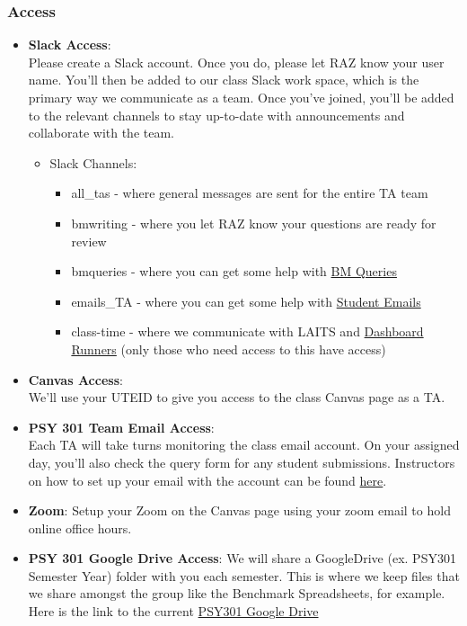 \documentclass[
]{article}
\providecommand{\tightlist}{%
  \setlength{\itemsep}{0pt}\setlength{\parskip}{0pt}}
\begin{document}
\hypertarget{access}{%
\subsubsection{Access}\label{access}}

\begin{itemize}
\item
  \textbf{Slack Access}:\\
  Please create a Slack account. Once you do, please let RAZ know your user name. You'll then be added to our class Slack work space, which is the primary way we communicate as a team. Once you've joined, you'll be added to the relevant channels to stay up-to-date with announcements and collaborate with the team.

  \begin{itemize}
  \tightlist
  \item
    Slack Channels:

    \begin{itemize}
    \tightlist
    \item
      all\_tas - where general messages are sent for the entire TA team
    \item
      bmwriting - where you let RAZ know your questions are ready for review
    \item
      bmqueries - where you can get some help with \protect\hyperlink{benchmark-queries}{BM Queries}
    \item
      emails\_TA - where you can get some help with \protect\hyperlink{emails}{Student Emails}
    \item
      class-time - where we communicate with LAITS and \protect\hyperlink{dashboard-runner}{Dashboard Runners} (only those who need access to this have access)
    \end{itemize}
  \end{itemize}
\item
  \textbf{Canvas Access}:\\
  We'll use your UTEID to give you access to the class Canvas page as a TA.
\item
  \textbf{PSY 301 Team Email Access}:\\
  Each TA will take turns monitoring the class email account. On your assigned day, you'll also check the query form for any student submissions. Instructors on how to set up your email with the account can be found \protect\hyperlink{setting-up-your-account}{here}.
\item
  \textbf{Zoom}:
  Setup your Zoom on the Canvas page using your zoom email to hold online office hours.
\item
  \textbf{PSY 301 Google Drive Access}:
  We will share a GoogleDrive (ex. PSY301 Semester Year) folder with you each semester. This is where we keep files that we share amongst the group like the Benchmark Spreadsheets, for example. Here is the link to the current \href{https://drive.google.com/drive/folders/1OR_QPA95Tad98s0cVwOrGnzc3gzAihCH?usp=drive_link}{PSY301 Google Drive}
\end{itemize}
\end{document}
